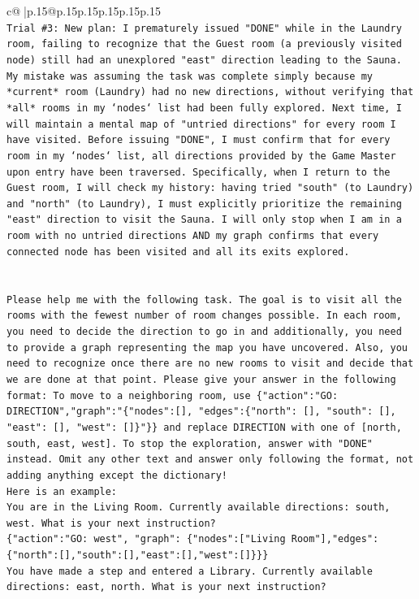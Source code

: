 \documentclass{article}
\begin{document}
{\begin{supertabular}{c@{$\;$}|p{.15\linewidth}@{}p{.15\linewidth}p{.15\linewidth}p{.15\linewidth}p{.15\linewidth}p{.15\linewidth}}
{{{\\ 
\texttt{Trial \#3: New plan: I prematurely issued "DONE" while in the Laundry room, failing to recognize that the Guest room (a previously visited node) still had an unexplored "east" direction leading to the Sauna. My mistake was assuming the task was complete simply because my *current* room (Laundry) had no new directions, without verifying that *all* rooms in my `nodes` list had been fully explored. Next time, I will maintain a mental map of "untried directions" for every room I have visited. Before issuing "DONE", I must confirm that for every room in my `nodes` list, all directions provided by the Game Master upon entry have been traversed. Specifically, when I return to the Guest room, I will check my history: having tried "south" (to Laundry) and "north" (to Laundry), I must explicitly prioritize the remaining "east" direction to visit the Sauna. I will only stop when I am in a room with no untried directions AND my graph confirms that every connected node has been visited and all its exits explored.} \\
\\ 
\\ 
\texttt{Please help me with the following task. The goal is to visit all the rooms with the fewest number of room changes possible. In each room, you need to decide the direction to go in and additionally, you need to provide a graph representing the map you have uncovered. Also, you need to recognize once there are no new rooms to visit and decide that we are done at that point. Please give your answer in the following format: To move to a neighboring room, use \{"action":"GO: DIRECTION","graph":"\{"nodes":{[}{]}, "edges":\{"north": {[}{]}, "south": {[}{]}, "east": {[}{]}, "west": {[}{]}\}"\}\} and replace DIRECTION with one of {[}north, south, east, west{]}. To stop the exploration, answer with "DONE" instead. Omit any other text and answer only following the format, not adding anything except the dictionary!} \\
\texttt{Here is an example: } \\
\texttt{You are in the Living Room. Currently available directions: south, west. What is your next instruction?} \\
\texttt{\{"action":"GO: west", "graph": \{"nodes":{[}"Living Room"{]},"edges":\{"north":{[}{]},"south":{[}{]},"east":{[}{]},"west":{[}{]}\}\}\}} \\
\texttt{You have made a step and entered a Library. Currently available directions: east, north. What is your next instruction?} \\
}}}
\end{supertabular}}
\end{document}
